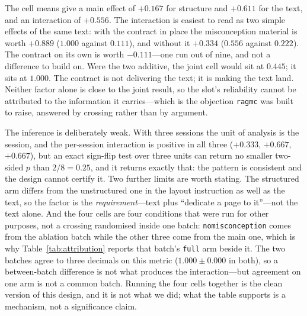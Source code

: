 \documentclass[review,12pt]{elsarticle}
\renewcommand{\_}{\kgunderscore\allowbreak}
\newcommand{\id}[1]{\texttt{#1}}
\begin{document}
\begin{table}[t]
\caption{The 2$\times$2 behind the misconception result: misconception coverage,
mean (standard deviation) over nine runs (three sessions $\times$ three
resamplings) per cell. ``Structure'' is the contract---concept list, ordering,
forbidden terms---plus the instruction to dedicate a page to the misconception;
``text'' is the misconception statement and its correction. Generated by
\id{paper/factorial.py}.}
\label{tab:factorial}
\centering
\small

\end{table}

The cell means give a main effect of $+0.167$ for structure and $+0.611$ for the
text, and an interaction of $+0.556$. The interaction is easiest to read as two
simple effects of the same text: with the contract in place the misconception
material is worth $+0.889$ ($1.000$ against $0.111$), and without it $+0.334$
($0.556$ against $0.222$). The contract on its own is worth $-0.111$---one run
out of nine, and not a difference to build on. Were the two additive, the joint
cell would sit at $0.445$; it sits at $1.000$. The contract is not
delivering the text; it is making the text land. Neither factor alone is close
to the joint result, so the slot's reliability cannot be attributed to the
information it carries---which is the objection \id{rag\_mc} was built to raise,
answered by crossing rather than by argument.

The inference is deliberately weak. With three sessions the unit of analysis is
the session, and the per-session interaction is positive in all three
($+0.333$, $+0.667$, $+0.667$), but an exact sign-flip test over three units can
return no smaller two-sided $p$ than $2/8 = 0.25$, and it returns exactly that:
the pattern is consistent and the design cannot certify it. Two further
limits are worth stating. The structured arm differs from the unstructured one in
the layout instruction as well as the text, so the factor is the
\emph{requirement}---text plus ``dedicate a page to it''---not the text alone.
And the four cells are four conditions that were run for other purposes, not a
crossing randomised inside one batch: \id{no\_misconception} comes from the
ablation batch while the other three come from the main one, which is why
Table~\ref{tab:attribution} reports that batch's \id{full} arm beside it. The two
batches agree to three decimals on this metric ($1.000 \pm 0.000$ in both), so a
between-batch difference is not what produces the interaction---but agreement on
one arm is not a common batch. Running the four cells together is the
clean version of this design, and it is not what we did; what the table supports
is a mechanism, not a significance claim.
\end{document}
